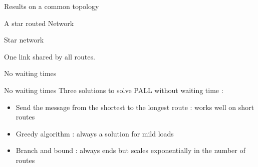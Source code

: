 \documentclass[10 pt]{beamer}
\begin{document}
\begin{section}{Results on a common topology}

\begin{subsection}{A star routed Network}
\begin{frame}{Star network}
  \centering
{}

\centering
\vspace{1cm} One link shared by all routes.
\end{frame}
\end{subsection}

\begin{subsection}{No waiting times}


\begin{frame}{No waiting times }
Three solutions to solve PALL without waiting time : 
\vspace{0.5cm}
\begin{itemize}
\item Send the message from the shortest to the longest route : works well on short routes

\vspace{0.5cm}

\item Greedy algorithm : always a solution for mild loads
\vspace{0.5cm}

\item Branch and bound : always ends but scales exponentially in the number of routes


\end{itemize}
\end{frame}
\end{subsection}
\end{section}
\end{document}
